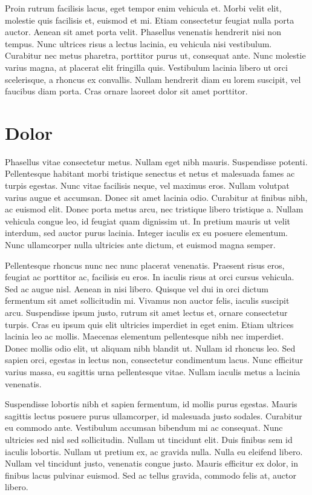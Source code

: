 \documentclass{myCompactDoc}
\begin{document}
Proin rutrum facilisis lacus, eget tempor enim vehicula et. Morbi velit elit, molestie quis facilisis et, euismod et mi. Etiam consectetur feugiat nulla porta auctor. Aenean sit amet porta velit. Phasellus venenatis hendrerit nisi non tempus. Nunc ultrices risus a lectus lacinia, eu vehicula nisi vestibulum. Curabitur nec metus pharetra, porttitor purus ut, consequat ante. Nunc molestie varius magna, at placerat elit fringilla quis. Vestibulum lacinia libero ut orci scelerisque, a rhoncus ex convallis. Nullam hendrerit diam eu lorem suscipit, vel faucibus diam porta. Cras ornare laoreet dolor sit amet porttitor.

\section{Dolor}
Phasellus vitae consectetur metus. Nullam eget nibh mauris. Suspendisse potenti. Pellentesque habitant morbi tristique senectus et netus et malesuada fames ac turpis egestas. Nunc vitae facilisis neque, vel maximus eros. Nullam volutpat varius augue et accumsan. Donec sit amet lacinia odio. Curabitur at finibus nibh, ac euismod elit. Donec porta metus arcu, nec tristique libero tristique a. Nullam vehicula congue leo, id feugiat quam dignissim ut. In pretium mauris ut velit interdum, sed auctor purus lacinia. Integer iaculis ex eu posuere elementum. Nunc ullamcorper nulla ultricies ante dictum, et euismod magna semper.

Pellentesque rhoncus nunc nec nunc placerat venenatis. Praesent risus eros, feugiat ac porttitor ac, facilisis eu eros. In iaculis risus at orci cursus vehicula. Sed ac augue nisl. Aenean in nisi libero. Quisque vel dui in orci dictum fermentum sit amet sollicitudin mi. Vivamus non auctor felis, iaculis suscipit arcu. Suspendisse ipsum justo, rutrum sit amet lectus et, ornare consectetur turpis. Cras eu ipsum quis elit ultricies imperdiet in eget enim. Etiam ultrices lacinia leo ac mollis. Maecenas elementum pellentesque nibh nec imperdiet. Donec mollis odio elit, ut aliquam nibh blandit ut. Nullam id rhoncus leo. Sed sapien orci, egestas in lectus non, consectetur condimentum lacus. Nunc efficitur varius massa, eu sagittis urna pellentesque vitae. Nullam iaculis metus a lacinia venenatis.

Suspendisse lobortis nibh et sapien fermentum, id mollis purus egestas. Mauris sagittis lectus posuere purus ullamcorper, id malesuada justo sodales. Curabitur eu commodo ante. Vestibulum accumsan bibendum mi ac consequat. Nunc ultricies sed nisl sed sollicitudin. Nullam ut tincidunt elit. Duis finibus sem id iaculis lobortis. Nullam ut pretium ex, ac gravida nulla. Nulla eu eleifend libero. Nullam vel tincidunt justo, venenatis congue justo. Mauris efficitur ex dolor, in finibus lacus pulvinar euismod. Sed ac tellus gravida, commodo felis at, auctor libero.
\end{document}
